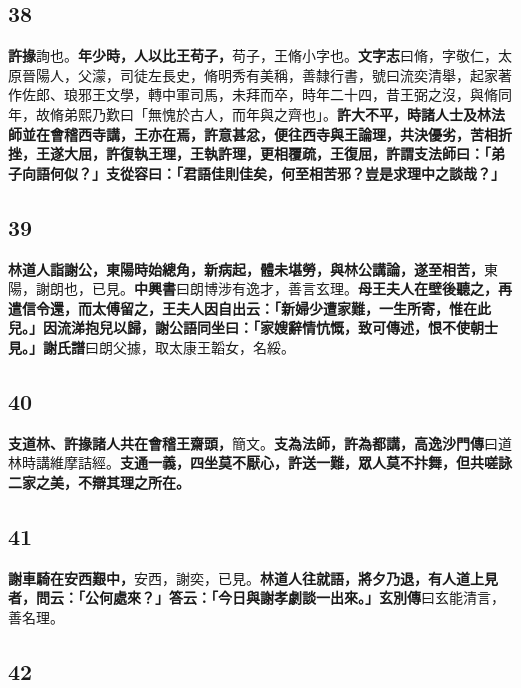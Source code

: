 \subsection*{38}

\textbf{許掾}{\footnotesize 詢也。}\textbf{年少時，人以比王苟子，}{\footnotesize 苟子，王脩小字也。\textbf{文字志}曰脩，字敬仁，太原晉陽人，父濛，司徒左長史，脩明秀有美稱，善隸行書，號曰流奕清舉，起家著作佐郎、琅邪王文學，轉中軍司馬，未拜而卒，時年二十四，昔王弼之沒，與脩同年，故脩弟熙乃歎曰「無愧於古人，而年與之齊也」。}\textbf{許大不平，時諸人士及林法師並在會稽西寺講，王亦在焉，許意甚忿，便往西寺與王論理，共決優劣，苦相折挫，王遂大屈，許復執王理，王執許理，更相覆疏，王復屈，許謂支法師曰：「弟子向語何似？」支從容曰：「君語佳則佳矣，何至相苦邪？豈是求理中之談哉？」}

\subsection*{39}

\textbf{林道人詣謝公，東陽時始總角，新病起，體未堪勞，與林公講論，遂至相苦，}{\footnotesize 東陽，謝朗也，已見。\textbf{中興書}曰朗博涉有逸才，善言玄理。}\textbf{母王夫人在壁後聽之，再遣信令還，而太傅留之，王夫人因自出云：「新婦少遭家難，一生所寄，惟在此兒。」因流涕抱兒以歸，謝公語同坐曰：「家嫂辭情忼慨，致可傳述，恨不使朝士見。」}{\footnotesize \textbf{謝氏譜}曰朗父據，取太康王韜女，名綏。}

\subsection*{40}

\textbf{支道林、許掾諸人共在會稽王齋頭，}{\footnotesize 簡文。}\textbf{支為法師，許為都講，}{\footnotesize \textbf{高逸沙門傳}曰道林時講維摩詰經。}\textbf{支通一義，四坐莫不厭心，許送一難，眾人莫不抃舞，但共嗟詠二家之美，不辯其理之所在。}

\subsection*{41}

\textbf{謝車騎在安西艱中，}{\footnotesize 安西，謝奕，已見。}\textbf{林道人往就語，將夕乃退，有人道上見者，問云：「公何處來？」答云：「今日與謝孝劇談一出來。」}{\footnotesize \textbf{玄別傳}曰玄能清言，善名理。}

\subsection*{42}

